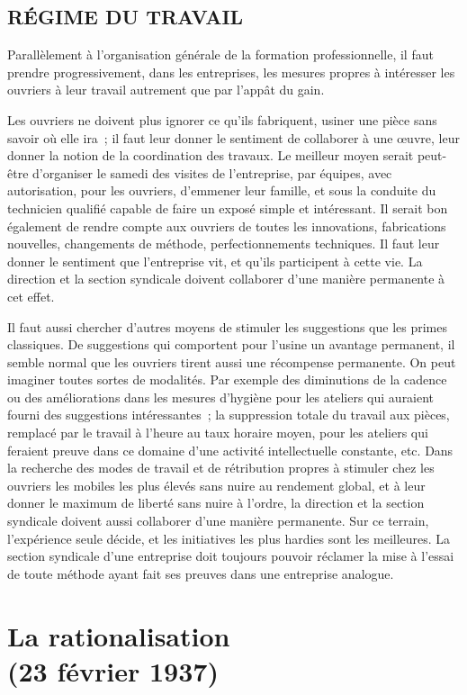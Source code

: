 \documentclass[french,twoside]{book} %
\begin{document}
\subsection[RÉGIME DU TRAVAIL]{RÉGIME DU TRAVAIL}
\noindent Parallèlement à l'organisation générale de la formation professionnelle, il faut prendre progressivement, dans les entreprises, les mesures propres à intéresser les ouvriers à leur travail autrement que par l'appât du gain.\par
Les ouvriers ne doivent plus ignorer ce qu'ils fabriquent, usiner une pièce sans savoir où elle ira ; il faut leur donner le sentiment de collaborer à une œuvre, leur donner la notion de la coordination des travaux. Le meilleur moyen serait peut-être d'organiser le samedi des visites de l'entreprise, par équipes, avec autorisation, pour les ouvriers, d'emmener leur famille, et sous la conduite du technicien qualifié capable de faire un exposé simple et intéressant. Il serait bon également de rendre compte aux ouvriers de toutes les innovations, fabrications nouvelles, changements de méthode, perfectionnements techniques. Il faut leur donner le sentiment que l'entreprise vit, et qu'ils participent à cette vie. La direction et la section syndicale doivent collaborer d'une manière permanente à cet effet.\par
Il faut aussi chercher d'autres moyens de stimuler les suggestions que les primes classiques. De suggestions qui comportent pour l'usine un avantage permanent, il semble normal que les ouvriers tirent aussi une récompense permanente. On peut imaginer toutes sortes de modalités. Par exemple des diminutions de la cadence ou des améliorations dans les mesures d'hygiène pour les ateliers qui auraient fourni des suggestions intéressantes ; la suppression totale du travail aux pièces, remplacé par le travail à l'heure au taux horaire moyen, pour les ateliers qui feraient preuve dans ce domaine d'une activité intellectuelle constante, etc. Dans la recherche des modes de travail et de rétribution propres à stimuler chez les ouvriers les mobiles les plus élevés sans nuire au rendement global, et à leur donner le maximum de liberté sans nuire à l'ordre, la direction et la section syndicale doivent aussi collaborer d'une manière permanente. Sur ce terrain, l'expérience seule décide, et les initiatives les plus hardies sont les meilleures. La section syndicale d'une entreprise doit toujours pouvoir réclamer la mise à l'essai de toute méthode ayant fait ses preuves dans une entreprise analogue.
\section[La rationalisation  (23 février 1937)]{La rationalisation \protect\footnotemark  \\
(23 février 1937)}\renewcommand{\leftmark}{La rationalisation  \\
(23 février 1937)}
\end{document}
